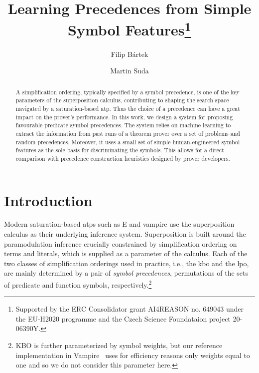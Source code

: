 

\title{Learning Precedences from Simple Symbol Features\thanks{Supported by the ERC Consolidator grant AI4REASON no. 649043 under the EU-H2020 programme and the Czech Science Foundataion project 20-06390Y.}}
\author{Filip B\'{a}rtek \and Martin Suda}



\maketitle

\begin{abstract}
A simplification ordering, typically specified by a symbol precedence,
is one of the key parameters of the superposition calculus, contributing
to shaping the search space navigated by a saturation-based \acrlong{atp}.
Thus the choice of a precedence can have a great impact on the prover's performance.
In this work, we design a system for proposing favourable predicate symbol precedences.
The system relies on machine learning to extract the information from
past runs of a theorem prover over a set of problems and random precedences.
Moreover, it uses a small set of simple human-engineered symbol features as the sole
basis for discriminating the symbols. This allows for a direct comparison
with precedence construction heuristics designed by prover developers.
\end{abstract}

\section{Introduction}

Modern saturation-based \glspl{atp} such as E \cite{SCV:CADE-2019} and \gls{vampire} \cite{Kovacs2013}
use the superposition calculus \cite{Nieuwenhuis2001} as their underlying inference system.
Superposition is built around the paramodulation inference \cite{Robinson1983} crucially
constrained by simplification ordering on terms and literals, which is supplied as a parameter of the calculus.
Each of the two classes of simplification orderings used in practice,
i.e., the \gls{kbo}
and the \gls{lpo},
are mainly determined by a pair of \emph{symbol precedences}, permutations of the sets of predicate and function symbols,
respectively.\footnote{
KBO is further parameterized by symbol weights, but our reference implementation in Vampire~\cite{Kovacs2013} 
uses for efficiency reasons only weights equal to one \cite{DBLP:conf/cade/KovacsMV11} and so we do not consider this parameter here.}

